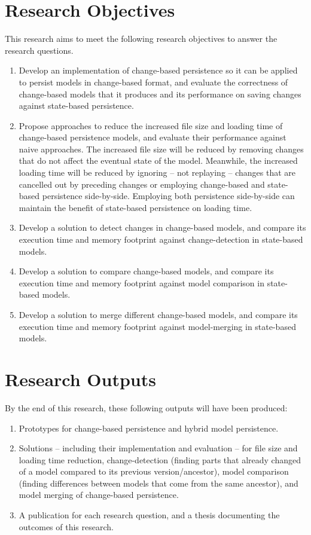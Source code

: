 \documentclass[12pt, a4paper]{report} \usepackage[titletoc]{appendix}
\begin{document}
\section{Research Objectives}
\label{sec:research_objectives}
This research aims to meet the following research objectives to answer the research questions.
\begin{enumerate}
\item Develop an implementation of change-based persistence so it can be applied to persist models in change-based format, and evaluate the correctness of change-based models that it produces and its performance on saving changes against state-based persistence. 
\item Propose approaches to reduce the increased file size and loading time of change-based persistence models, and evaluate their performance against naive approaches. The increased file size will be reduced by removing changes that do not affect the eventual state of the model. Meanwhile, the increased loading time will be reduced by ignoring -- not replaying -- changes that are cancelled out by preceding changes or employing change-based and state-based persistence side-by-side. Employing both persistence side-by-side can maintain the benefit of state-based persistence on loading time. 
\item Develop a solution to detect changes in change-based models, and compare its execution time and memory footprint against change-detection in state-based models.
\item Develop a solution to compare change-based models, and compare its execution time and memory footprint against model comparison in state-based models.
\item Develop a solution to merge different change-based models, and compare its execution time and memory footprint against model-merging in state-based models. 
\end{enumerate}

\section{Research Outputs}
\label{sec:research_outputs}
By the end of this research, these following outputs will have been produced:
\begin{enumerate}
\item Prototypes for change-based persistence and hybrid model persistence. 
\item Solutions -- including their implementation and evaluation -- for file size and loading time reduction, change-detection (finding parts that already changed of a model compared to its previous version/ancestor), model comparison (finding differences between models that come from the same ancestor), and model merging of change-based persistence.
\item A publication for each research question, and a thesis documenting the outcomes of this research.
\end{enumerate}
\end{document}
